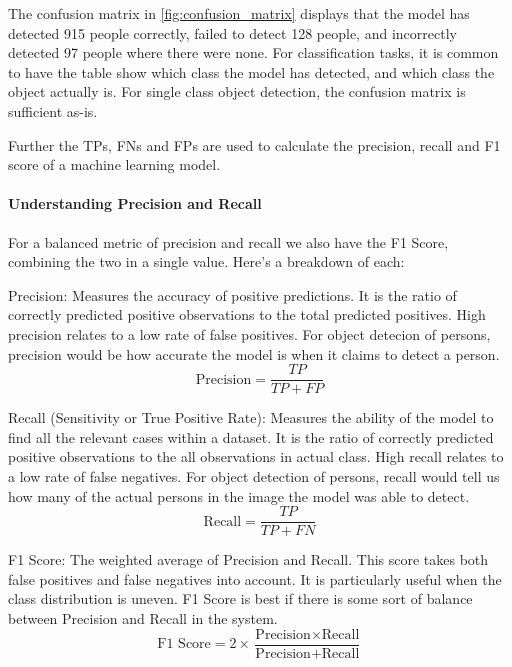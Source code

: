 The confusion matrix in \ref{fig:confusion_matrix} displays that the model has detected 915 people correctly, failed to detect 128 people, and incorrectly detected 97 people where there were none. For classification tasks, it is common to have the table show which class the model has detected, and which class the object actually is. For single class object detection, the confusion matrix is sufficient as-is.

Further the TPs, FNs and FPs are used to calculate the precision, recall and F1 score of a machine learning model.

\paragraph{Understanding Precision and Recall}
\label{sec:understandingprecision}
For a balanced metric of precision and recall we also have the F1 Score, combining the two in a single value. Here’s a breakdown of each:

Precision: Measures the accuracy of positive predictions. It is the ratio of correctly predicted positive observations to the total predicted positives. High precision relates to a low rate of false positives. For object detecion of persons, precision would be how accurate the model is when it claims to detect a person.
\begin{equation}
    \text{Precision} = \frac{TP}{TP + FP}	
\end{equation}

Recall (Sensitivity or True Positive Rate): Measures the ability of the model to find all the relevant cases within a dataset. It is the ratio of correctly predicted positive observations to the all observations in actual class. High recall relates to a low rate of false negatives. For object detection of persons, recall would tell us how many of the actual persons in the image the model was able to detect.
\begin{equation}
    \text{Recall} = \frac{TP}{TP + FN}	
\end{equation}

F1 Score: The weighted average of Precision and Recall. This score takes both false positives and false negatives into account. It is particularly useful when the class distribution is uneven. F1 Score is best if there is some sort of balance between Precision and Recall in the system.
\begin{equation}
    \text{F1 Score} = 2 \times \frac{\text{Precision} \times \text{Recall}}{\text{Precision} + \text{Recall}}
\end{equation}

